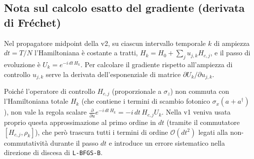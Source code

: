 \documentclass[11pt,a4paper]{article}
\begin{document}
\subsection*{Nota sul calcolo esatto del gradiente (derivata di Fréchet)}
Nel propagatore midpoint della v2, su ciascun intervallo temporale $k$ di ampiezza $dt = T/N$ l'Hamiltoniana è costante a tratti, $H_k = H_0 + \sum_j u_{j,k} H_{c,j}$, e il passo di evoluzione è $U_k = e^{-i\,dt\,H_k}$. Per calcolare il gradiente rispetto all'ampiezza di controllo $u_{j,k}$ serve la derivata dell'esponenziale di matrice $\partial U_k / \partial u_{j,k}$.

\noindent
Poiché l'operatore di controllo $H_{c,j}$ (proporzionale a $\sigma_z$) non commuta con l'Hamiltoniana totale $H_k$ (che contiene i termini di scambio fotonico $\sigma_x(a+a^\dagger)$), non vale la regola scalare $\frac{\partial}{\partial u}e^{-i\,dt\,H_k} = -i\,dt\,H_{c,j} U_k$. Nella v1 veniva usata proprio questa approssimazione al primo ordine in $dt$ (tramite il commutatore $[H_{c,j}, \rho_k]$), che però trascura tutti i termini di ordine $\mathcal{O}(dt^2)$ legati alla non-commutatività durante il passo $dt$ e introduce un errore sistematico nella direzione di discesa di \texttt{L-BFGS-B}.
\end{document}
